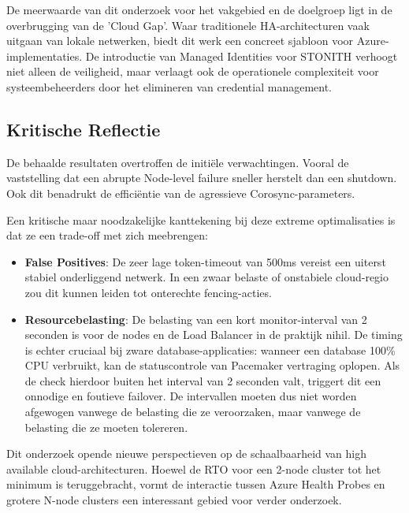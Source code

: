 De meerwaarde van dit onderzoek voor het vakgebied en de doelgroep ligt in de overbrugging van de 'Cloud Gap'. Waar traditionele HA-architecturen vaak uitgaan van lokale netwerken, biedt dit werk een concreet sjabloon voor Azure-implementaties. De introductie van Managed Identities voor STONITH verhoogt niet alleen de veiligheid, maar verlaagt ook de operationele complexiteit voor systeembeheerders door het elimineren van credential management.

\subsection{Kritische Reflectie}
De behaalde resultaten overtroffen de initiële verwachtingen. Vooral de vaststelling dat een abrupte Node-level failure sneller herstelt dan een shutdown. Ook dit benadrukt de efficiëntie van de agressieve Corosync-parameters.
\medskip 

Een kritische maar noodzakelijke kanttekening bij deze extreme optimalisaties is dat ze een trade-off met zich meebrengen:
\begin{itemize}
    \item \textbf{False Positives}: De zeer lage token-timeout van 500ms vereist een uiterst stabiel onderliggend netwerk. In een zwaar belaste of onstabiele cloud-regio zou dit kunnen leiden tot onterechte fencing-acties.
    \item \textbf{Resourcebelasting}: De belasting van een kort monitor-interval van 2 seconden is voor de nodes en de Load Balancer in de praktijk nihil. De timing is echter cruciaal bij zware database-applicaties: wanneer een database 100\% CPU verbruikt, kan de statuscontrole van Pacemaker vertraging oplopen. Als de check hierdoor buiten het interval van 2 seconden valt, triggert dit een onnodige en foutieve failover. De intervallen moeten dus niet worden afgewogen vanwege de belasting die ze veroorzaken, maar vanwege de belasting die ze moeten tolereren.
\end{itemize}

Dit onderzoek opende nieuwe perspectieven op de schaalbaarheid van high available cloud-architecturen. Hoewel de RTO voor een 2-node cluster tot het minimum is teruggebracht, vormt de interactie tussen Azure Health Probes en grotere N-node clusters een interessant gebied voor verder onderzoek.
